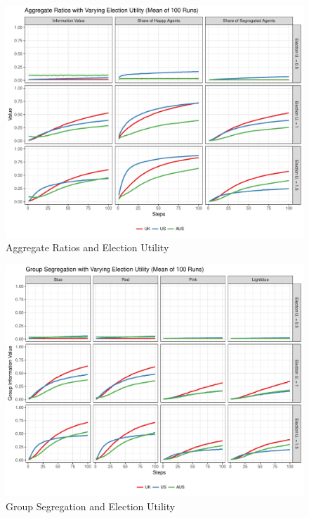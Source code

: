 \documentclass[12pt, a4paper]{article}
\begin{document}
	\begin{figure}[bp!]
		\centering
		\caption{Aggregate Ratios and Election Utility}
		\includegraphics[scale=0.6]{./Plots/el_agg_ratios.pdf}
	\end{figure}
	
	\begin{figure}[bp!]
		\centering
		\caption{Group Segregation and Election Utility}
		\includegraphics[scale=0.6]{./Plots/el_grp_ratios.pdf}
	\end{figure}
	
\end{document}
